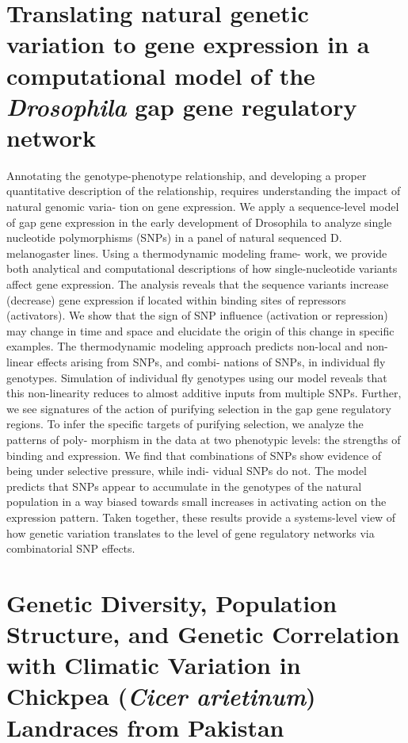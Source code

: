 \section{Translating natural genetic variation to gene expression in a computational model of the \emph{Drosophila} gap gene regulatory network \cite{gursky2017}}
Annotating the genotype-phenotype relationship, and developing a proper quantitative description of the relationship, requires understanding the impact of natural genomic varia- tion on gene expression. We apply a sequence-level model of gap gene expression in the early development of Drosophila to analyze single nucleotide polymorphisms (SNPs) in a panel of natural sequenced D. melanogaster lines. Using a thermodynamic modeling frame- work, we provide both analytical and computational descriptions of how single-nucleotide variants affect gene expression. The analysis reveals that the sequence variants increase (decrease) gene expression if located within binding sites of repressors (activators). We show that the sign of SNP influence (activation or repression) may change in time and space and elucidate the origin of this change in specific examples. The thermodynamic modeling approach predicts non-local and non-linear effects arising from SNPs, and combi- nations of SNPs, in individual fly genotypes. Simulation of individual fly genotypes using our model reveals that this non-linearity reduces to almost additive inputs from multiple SNPs. Further, we see signatures of the action of purifying selection in the gap gene regulatory regions. To infer the specific targets of purifying selection, we analyze the patterns of poly- morphism in the data at two phenotypic levels: the strengths of binding and expression. We find that combinations of SNPs show evidence of being under selective pressure, while indi- vidual SNPs do not. The model predicts that SNPs appear to accumulate in the genotypes of the natural population in a way biased towards small increases in activating action on the expression pattern. Taken together, these results provide a systems-level view of how genetic variation translates to the level of gene regulatory networks via combinatorial SNP effects.


\newpage

\section{Genetic Diversity, Population Structure, and Genetic Correlation with Climatic Variation in Chickpea (\emph{Cicer arietinum}) Landraces from Pakistan \cite{Sani2018}}

